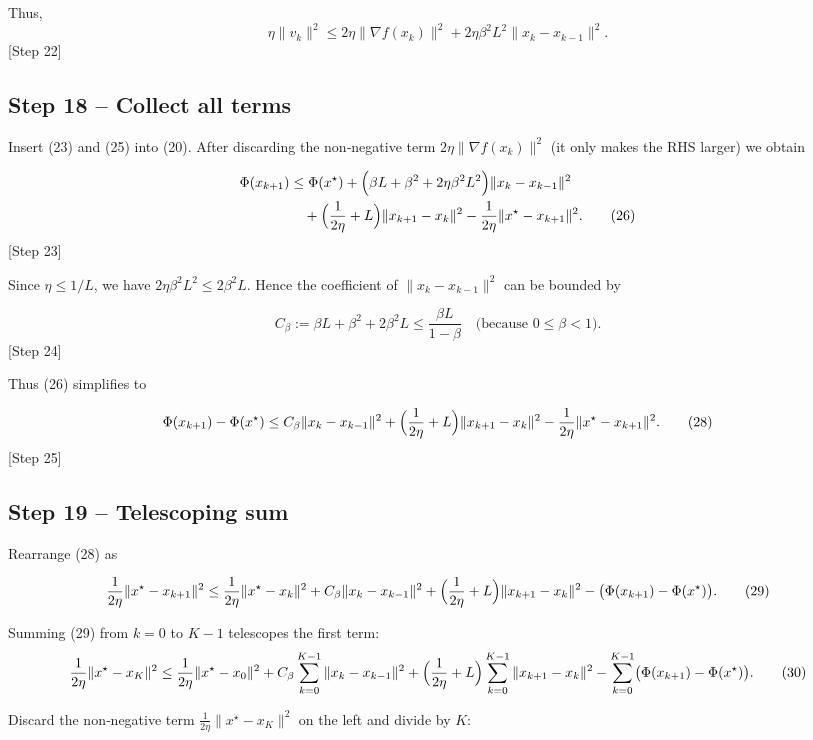 \documentclass{article}
\begin{document}
Thus,
\[
\eta\|v_{k}\|^{2}\le 2\eta\|\nabla f(x_{k})\|^{2}+2\eta\beta^{2}L^{2}\|x_{k}-x_{k-1}\|^{2}. \tag{25}
\]
[Step 22]

\subsection*{Step 18 – Collect all terms}
Insert (23) and (25) into (20). After discarding the non‑negative term $2\eta\|\nabla f(x_{k})\|^{2}$ (it only makes the RHS larger) we obtain

\[
\begin{aligned}
\Phi(x_{k+1}) 
&\le \Phi(x^{\star})
+\Bigl(\beta L+ \beta^{2}+2\eta\beta^{2}L^{2}\Bigr)\|x_{k}-x_{k-1}\|^{2}\\
&\quad+\Bigl(\frac{1}{2\eta}+L\Bigr)\|x_{k+1}-x_{k}\|^{2}
-\frac{1}{2\eta}\|x^{\star}-x_{k+1}\|^{2}. \tag{26}
\end{aligned}
\]
[Step 23]

Since $\eta\le 1/L$, we have $2\eta\beta^{2}L^{2}\le 2\beta^{2}L$. Hence the coefficient of $\|x_{k}-x_{k-1}\|^{2}$ can be bounded by  

\[
C_{\beta}:=\beta L+\beta^{2}+2\beta^{2}L
\le \frac{\beta L}{1-\beta}\quad\text{(because }0\le\beta<1\text{)}. \tag{27}
\]
[Step 24]

Thus (26) simplifies to

\[
\Phi(x_{k+1})-\Phi(x^{\star})
\le
C_{\beta}\|x_{k}-x_{k-1}\|^{2}
+\Bigl(\frac{1}{2\eta}+L\Bigr)\|x_{k+1}-x_{k}\|^{2}
-\frac{1}{2\eta}\|x^{\star}-x_{k+1}\|^{2}. \tag{28}
\]
[Step 25]

\subsection*{Step 19 – Telescoping sum}
Rearrange (28) as

\[
\frac{1}{2\eta}\|x^{\star}-x_{k+1}\|^{2}
\le
\frac{1}{2\eta}\|x^{\star}-x_{k}\|^{2}
+ C_{\beta}\|x_{k}-x_{k-1}\|^{2}
+\Bigl(\frac{1}{2\eta}+L\Bigr)\|x_{k+1}-x_{k}\|^{2}
-\bigl(\Phi(x_{k+1})-\Phi(x^{\star})\bigr). \tag{29}
\]

Summing (29) from $k=0$ to $K-1$ telescopes the first term:
\[
\frac{1}{2\eta}\|x^{\star}-x_{K}\|^{2}
\le
\frac{1}{2\eta}\|x^{\star}-x_{0}\|^{2}
+ C_{\beta}\sum_{k=0}^{K-1}\|x_{k}-x_{k-1}\|^{2}
+\Bigl(\frac{1}{2\eta}+L\Bigr)\sum_{k=0}^{K-1}\|x_{k+1}-x_{k}\|^{2}
-\sum_{k=0}^{K-1}\bigl(\Phi(x_{k+1})-\Phi(x^{\star})\bigr). \tag{30}
\]

Discard the non‑negative term $\frac{1}{2\eta}\|x^{\star}-x_{K}\|^{2}$ on the left and divide by $K$:
\end{document}
